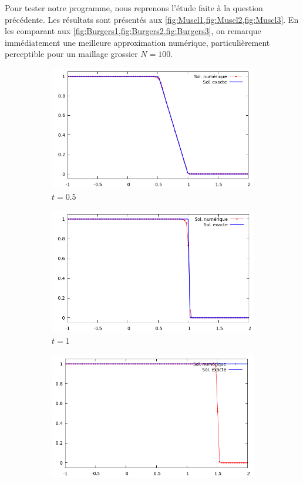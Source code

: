\documentclass[
	french,
	11pt, %
]{fphw}
\begin{document}
\noindent Pour tester notre programme, nous reprenons l'étude faite à la question précédente. Les résultats sont présentés aux \cref{fig:Muscl1,fig:Muscl2,fig:Muscl3}. En les comparant aux \cref{fig:Burgers1,fig:Burgers2,fig:Burgers3}, on remarque immédiatement une meilleure approximation numérique, particulièrement perceptible pour un maillage grossier $N=100$.

\begin{figure}[H]
	\centering
	\begin{subfigure}{0.32\textwidth}
		\centering
		\includegraphics[width=\textwidth]{Muscl2.png}
		\caption{$t=0.5$}
	\end{subfigure}
	\begin{subfigure}{0.32\textwidth}
		\centering
		\includegraphics[width=\textwidth]{Muscl3.png}
		\caption{$t=1$}
	\end{subfigure}
	\begin{subfigure}{0.32\textwidth}
		\centering
		\includegraphics[width=\textwidth]{Muscl4.png}

\end{subfigure}
\end{figure}
\end{document}
